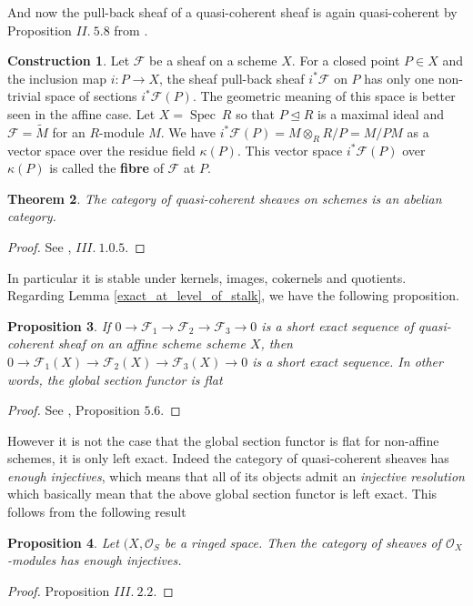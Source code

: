 \documentclass{article}
\theoremstyle{plain}
\newtheorem{theorem}{Theorem}[subsection]
\newtheorem{proposition}[theorem]{Proposition}
\theoremstyle{definition}
\newtheorem{construction}[theorem]{Construction}
\DeclareMathOperator{\Spec}{Spec}
\begin{document}
\noindent And now the pull-back sheaf of a quasi-coherent sheaf is again quasi-coherent by Proposition $II.\:5.8$ from \cite{Hartshorne}.

\begin{construction}
    Let $\mathcal{F}$ be a sheaf on a scheme $X$. 
    For a closed point $P\in X$ and the inclusion map $i:P\rightarrow X$, the sheaf pull-back sheaf $i^*\mathcal{F}$ on $P$ has only one non-trivial space of sections $i^*\mathcal{F}(P)$.
    The geometric meaning of this space is better seen in the affine case.
    Let $X = \Spec\: R$ so that $P\trianglelefteq R$ is a maximal ideal and $\mathcal{F} = \widetilde{M}$ for an $R$-module $M$.
    We have $i^*\mathcal{F}(P) = M\otimes_R R/P = M/PM$ as a vector space over the residue field $\kappa(P)$.
    This vector space $i^*\mathcal{F}(P)$ over $\kappa(P)$ is called the \textbf{fibre} of $\mathcal{F}$ at $P$.
\end{construction}


\begin{theorem}
    The category of quasi-coherent sheaves on schemes is an abelian category.
\end{theorem}
\begin{proof}
    See \cite{Hartshorne}, $III.\: 1.0.5$.
\end{proof}

\noindent In particular it is stable under kernels, images, cokernels and quotients.\\
Regarding Lemma \ref{exact_at_level_of_stalk}, we have the following proposition.
\begin{proposition}
    If $0\rightarrow\mathcal{F}_1\rightarrow \mathcal{F}_2 \rightarrow \mathcal{F}_3\rightarrow 0$ is a short exact sequence of quasi-coherent sheaf on an affine scheme scheme $X$, then 
    $0\rightarrow\mathcal{F}_1(X)\rightarrow \mathcal{F}_2(X) \rightarrow \mathcal{F}_3(X)\rightarrow 0$ is a short exact sequence. 
    In other words, the global section functor is flat
\end{proposition}
\begin{proof}
    See \cite{Hartshorne}, Proposition $5.6$.
\end{proof}

\noindent However it is not the case that the global section functor is flat for non-affine schemes, it is only left exact.
Indeed the category of quasi-coherent sheaves has \textit{enough injectives}, which means that all of its objects admit an \textit{injective resolution} which basically mean that the above global section functor is left exact. This follows from the following result
\begin{proposition}
     Let $(X,\mathcal{O}_S$ be a ringed space. Then the category of sheaves of $\mathcal{O}_X$-modules has enough injectives.
\end{proposition}
\begin{proof}
    \cite{Hartshorne} Proposition $III.\: 2.2$.
\end{proof}
\end{document}
